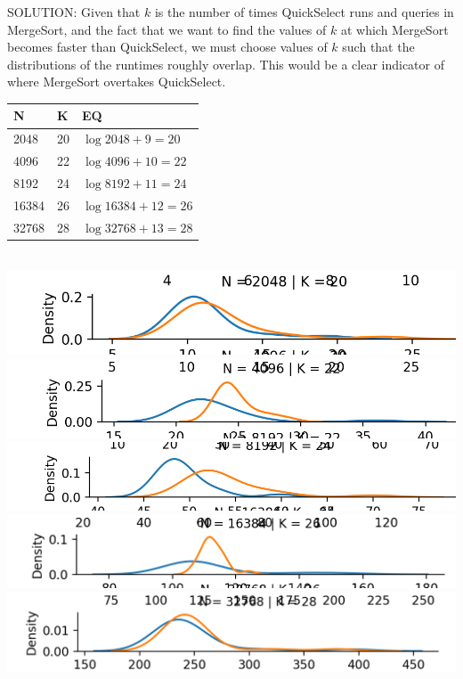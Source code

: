 \documentclass[11pt]{article}
\begin{document}
\begin{enumerate}
\begin{enumerate}
        SOLUTION: Given that $k$ is the number of times QuickSelect runs and queries in MergeSort, and the fact that we want to find the values of $k$ at which MergeSort becomes faster than QuickSelect, we must choose values of $k$ such that the distributions of the runtimes roughly overlap. This would be a clear indicator of where MergeSort overtakes QuickSelect. \\
        
        \begin{tabular}{ | m{5em} | m{1cm}| m{1cm} | } 
  \hline
  N & K  & EQ\\ 
  \hline
  2048 & 20 & $\log 2048 + 9 = 20$\\ 
  \hline
  4096 & 22 & $\log 4096 + 10 = 22$ \\ 
  \hline
  8192 & 24 &  $\log 8192 + 11 = 24$ \\
  \hline
  16384 & 26 &  $\log 16384 + 12 = 26$ \\
  \hline
  32768 & 28 &  $\log 32768 + 13 = 28$ \\
  \hline
\end{tabular} \\

\includegraphics[width = \textwidth]{k=20}\\
\includegraphics[width =\textwidth]{k=22}\\
\includegraphics[width = \textwidth]{k=24}\\
\includegraphics[width = \textwidth]{k=26}\\
\includegraphics[width = \textwidth]{k=28}\\


\end{enumerate}
\end{enumerate}
\end{document}
